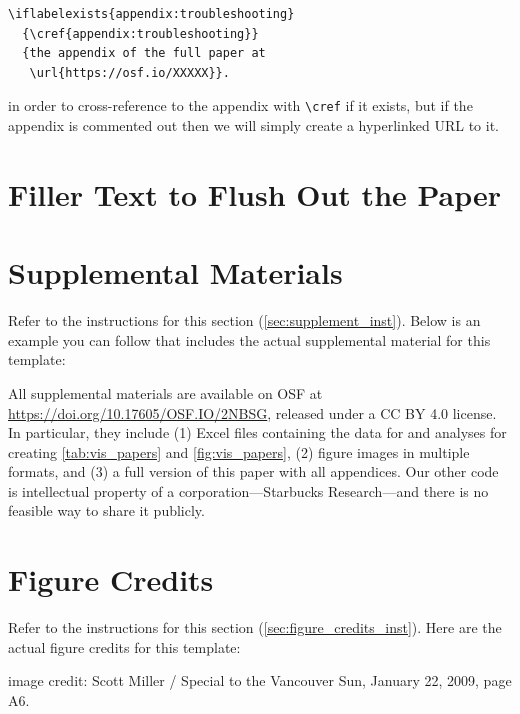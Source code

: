 \documentclass[journal]{vgtc}                     %
\begin{document}
\begin{verbatim}
\iflabelexists{appendix:troubleshooting}
  {\cref{appendix:troubleshooting}}
  {the appendix of the full paper at
   \url{https://osf.io/XXXXX}}.
\end{verbatim}

in order to cross-reference to the appendix with \verb|\cref| if it exists, but if the appendix is commented out then we will simply create a hyperlinked URL to it.


\section{Filler Text to Flush Out the Paper}

\lipsum[1-2]%



\section*{Supplemental Materials}
\label{sec:supplemental_materials}

Refer to the instructions for this section (\cref{sec:supplement_inst}).
Below is an example you can follow that includes the actual supplemental material for this template:

All supplemental materials are available on OSF at \url{https://doi.org/10.17605/OSF.IO/2NBSG}, released under a CC BY 4.0 license.
In particular, they include (1) Excel files containing the data for and analyses for creating \cref{tab:vis_papers} and \cref{fig:vis_papers}, (2) figure images in multiple formats, and (3) a full version of this paper with all appendices.
Our other code is intellectual property of a corporation---Starbucks Research---and there is no feasible way to share it publicly.


\section*{Figure Credits}
\label{sec:figure_credits}

Refer to the instructions for this section (\cref{sec:figure_credits_inst}).
Here are the actual figure credits for this template:

 image credit: Scott Miller / Special to the Vancouver Sun, January 22, 2009, page A6.
\end{document}
